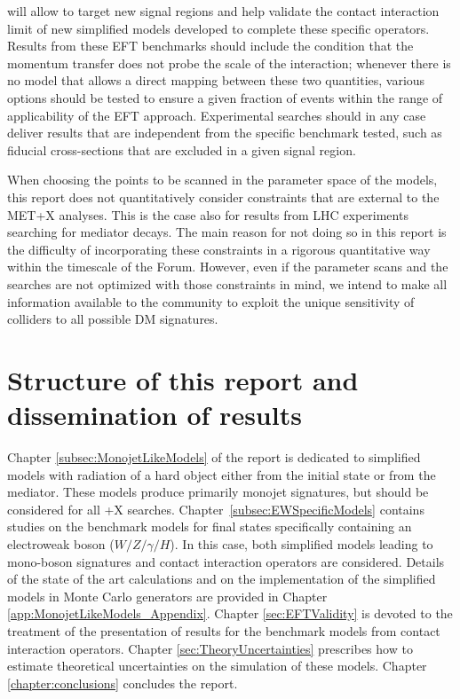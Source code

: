 will allow to target new signal regions and help validate the 
contact interaction limit of new simplified models 
developed to complete these specific operators. 
Results from these EFT benchmarks should include the condition that
the momentum transfer does not probe the scale of the interaction; whenever there is no model
that allows a direct mapping between these two quantities, various options should be tested to 
ensure a given fraction of events within the range of applicability of the EFT approach.
Experimental searches should in any case deliver 
results that are independent from the specific benchmark tested, such as fiducial cross-sections that
are excluded in a given signal region. 

When choosing the points to be scanned in the parameter space of the models,
this report does not quantitatively consider constraints that are 
external to the MET+X analyses. This is the case also for results from LHC experiments
searching for mediator decays. 
The main reason for not doing so in this report 
is the difficulty of incorporating these constraints in a rigorous quantitative way within
the timescale of the Forum. However, even if the parameter scans
and the searches are not optimized with those constraints in mind, 
we intend to make all information available to the community to exploit
the unique sensitivity of colliders to all possible DM signatures. 

\section{Structure of this report and dissemination of results}

Chapter \ref{subsec:MonojetLikeModels} of the report is dedicated to simplified
models with radiation of a hard object either from the initial state
or from the mediator. These models produce primarily monojet signatures, 
but should be considered for all \MET{}+X searches.
Chapter~\ref{subsec:EWSpecificModels} contains studies on the benchmark models
for final states specifically containing an electroweak 
boson ($W/Z/\gamma/H$). In this case, both 
simplified models leading to mono-boson signatures
and contact interaction operators are considered. 
Details of the state of the art calculations and on the implementation of the simplified models in
Monte Carlo generators are provided in
Chapter \ref{app:MonojetLikeModels_Appendix}.
Chapter \ref{sec:EFTValidity} is devoted to the treatment of the presentation of results for the benchmark
models from contact interaction operators. 
Chapter \ref{sec:TheoryUncertainties} prescribes how to estimate theoretical uncertainties on the simulation of these models. 
Chapter \ref{chapter:conclusions} concludes the report.

